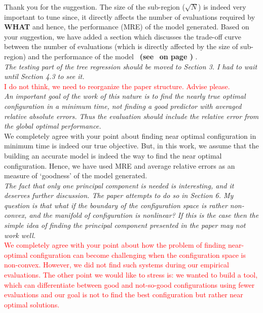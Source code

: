 \documentclass[smallextended]{svjour3}       %
\newcommand{\review}[1]{{\textit{#1}}~\\}
\newcommand{\citeresp}[1]{
{\bf (see } \fcolorbox{black}{black!15}{
 \bf
  \scriptsize R-{#1}}~{\bf{on page \pageref{response:#1})}}
}
\newcommand{\what}{{\bf WHAT}\xspace}
\begin{document}
\noindent
Thank you for the suggestion. The size of the sub-region ($\sqrt{N}$) is indeed very important to tune since, it directly affects the number of evaluations required by \what{} and hence, the performance (MRE) of the model generated. Based on your suggestion, we have added a section which discusses the trade-off curve between the number of evaluations (which is directly affected by the size of sub-region) and the performance of the model~\citeresp{1b}.\\

\noindent
\review{The testing part of the tree regression should be moved to Section 3. I had to wait until Section 4.3 to see it.}

\noindent
\textcolor{red}{I do not think, we need to reorganize the paper structure. Advise please.}\\

\noindent
\review{An important goal of the work of this nature is to find the nearly true optimal configuration in a minimum time, not finding a good predictor with averaged relative absolute errors. Thus the evaluation should include the relative error from the global optimal performance.}

\noindent
We completely agree with your point about finding near optimal configuration in minimum time is indeed our true objective. But, in this work, we assume that the building an accurate model is indeed the way to find the near optimal configuration. Hence, we have used MRE and average relative errors as an measure of `goodness' of the model generated.\\

\noindent
\review{The fact that only one principal component is needed is interesting, and it deserves further discussion. The paper attempts to do so in Section 6. My question is that what if the boundary of the configuration space is rather non-convex, and the manifold of configuration is nonlinear? If this is the case then the simple idea of finding the principal component presented in the paper may not work well.
}

\noindent
\textcolor{red}{We completely agree with your point about how the problem of finding near-optimal configuration can become challenging when the configuration space is non-convex. However, we did not find such systems during our empirical evaluations. The other point we would like to stress is: we wanted to build a tool, which can differentiate between good and not-so-good configurations using fewer evaluations and our goal is not to find the best configuration but rather near optimal solutions.}\\
\end{document}
